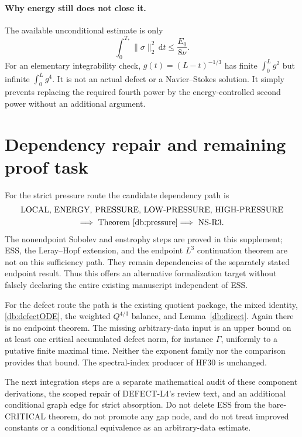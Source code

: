 \documentclass[11pt,a4paper]{article}
\theoremstyle{definition}\newtheorem{hypothesis}[theorem]{Hypothesis}
\theoremstyle{remark}\newtheorem{remark}[theorem]{Remark}
\newcommand{\dd}{\,\mathrm d}
\newcommand{\norm}[1]{\lVert #1\rVert}
\numberwithin{equation}{section}
\begin{document}
\paragraph{Why energy still does not close it.}
The available unconditional estimate is only
\[
 \int_0^{T_*}\norm\sigma_2^2\dd t\le\frac{E_0}{8\nu}.
\]
For an elementary integrability check, $g(t)=(L-t)^{-1/3}$ has finite
$\int_0^Lg^2$ but infinite $\int_0^Lg^4$. It is not an actual defect or a
Navier--Stokes solution. It simply prevents replacing the required fourth
power by the energy-controlled second power without an additional argument.

\section{Dependency repair and remaining proof task}
For the strict pressure route the candidate dependency path is
\[
 \begin{gathered}
 \text{LOCAL, ENERGY, PRESSURE, LOW-PRESSURE, HIGH-PRESSURE}\\
 \Longrightarrow\ \text{Theorem~\ref{db:pressure}}
 \Longrightarrow\ \text{NS-R3}.
 \end{gathered}
\]
The nonendpoint Sobolev and enstrophy steps are proved in this supplement;
ESS, the Leray--Hopf extension, and the endpoint $L^3$ continuation theorem
are not on this sufficiency path. They remain dependencies of the separately
stated endpoint result. Thus this offers an alternative formalization target
without falsely declaring the entire existing manuscript independent of ESS.

For the defect route the path is the existing quotient package, the
mixed identity, \eqref{db:defectODE}, the weighted $Q^{4/3}$ balance, and
Lemma~\ref{db:direct}. Again there is no endpoint theorem. The missing
arbitrary-data input is an upper bound on at least one critical accumulated
defect norm, for instance $\Gamma$, uniformly to a putative finite maximal
time. Neither the exponent family nor the comparison provides that bound.
The spectral-index producer of HF30 is unchanged.

The next integration steps are a separate mathematical audit of these
component derivations, the scoped repair of DEFECT-L4's review text, and an
additional conditional graph edge for strict absorption. Do not delete ESS
from the bare-CRITICAL theorem, do not promote any gap node, and do not treat
improved constants or a conditional equivalence as an arbitrary-data estimate.
\end{document}
